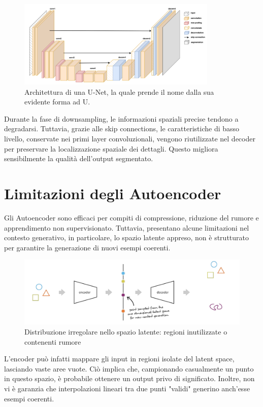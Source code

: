 \begin{figure}[!ht]
    \centering
    \includegraphics[width=0.85\textwidth]{figure/UNet.png}
    \caption{Architettura di una U-Net, la quale prende il nome dalla sua evidente forma ad U.}
    \label{fig:unet}
\end{figure}

Durante la fase di downsampling, le informazioni spaziali precise tendono a degradarsi. Tuttavia, grazie alle skip connections, le caratteristiche di basso livello, conservate nei primi layer convoluzionali, vengono riutilizzate nel decoder per preservare la localizzazione spaziale dei dettagli. Questo migliora sensibilmente la qualità dell'output segmentato.

\section{Limitazioni degli Autoencoder}

Gli Autoencoder sono efficaci per compiti di compressione, riduzione del rumore e apprendimento non supervisionato. Tuttavia, presentano alcune limitazioni nel contesto generativo, in particolare, lo spazio latente appreso, non è strutturato per garantire la generazione di nuovi esempi coerenti.

\begin{figure}[!ht]
\centering
\includegraphics[width=\textwidth]{figure/EncLimit.png}
\caption{Distribuzione irregolare nello spazio latente: regioni inutilizzate o contenenti rumore}
\label{fig:enclimit}
\end{figure}

L’encoder può infatti mappare gli input in regioni isolate del latent space, lasciando vaste aree vuote. Ciò implica che, campionando casualmente un punto in questo spazio, è probabile ottenere un output privo di significato. Inoltre, non vi è garanzia che interpolazioni lineari tra due punti "validi" generino anch’esse esempi coerenti.


